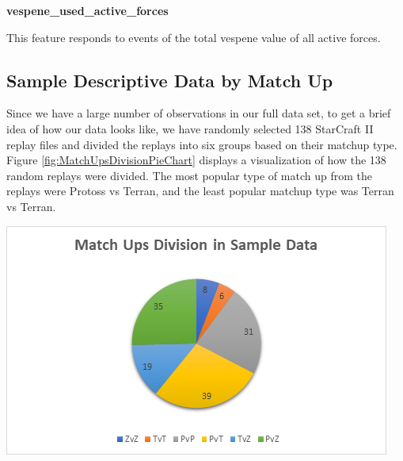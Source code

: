 \documentclass[a4paper,12pt]{report}
\newcommand{\msection}[1]{\noindent\textbf{#1}}
\begin{document}
\msection{vespene\_used\_active\_forces}

This feature responds to events of the total vespene value of all active forces.


\subsection{Sample Descriptive Data by Match Up}
Since we have a large number of observations in our full data set, to get a brief idea of how our data looks like, we have randomly selected 138 StarCraft II replay files and divided the replays into six groups based on their matchup type. Figure \ref{fig:MatchUpsDivisionPieChart} displays a visualization of how the 138 random replays were divided. The most popular type of match up from the replays were Protoss vs Terran, and the least popular matchup type was Terran vs Terran. 

\begin{center}
    \captionsetup{type=figure}
    \includegraphics[width=.9\linewidth]{media/MatchUpsDivisionPieChart.png}
    \label{fig:MatchUpsDivisionPieChart}
\end{center}
\end{document}
